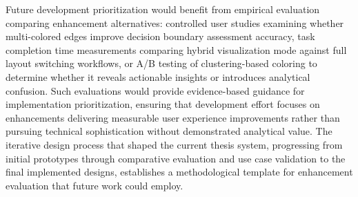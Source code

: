 Future development prioritization would benefit from empirical evaluation comparing enhancement alternatives: controlled user studies examining whether multi-colored edges improve decision boundary assessment accuracy, task completion time measurements comparing hybrid visualization mode against full layout switching workflows, or A/B testing of clustering-based coloring to determine whether it reveals actionable insights or introduces analytical confusion. Such evaluations would provide evidence-based guidance for implementation prioritization, ensuring that development effort focuses on enhancements delivering measurable user experience improvements rather than pursuing technical sophistication without demonstrated analytical value. The iterative design process that shaped the current thesis system, progressing from initial prototypes through comparative evaluation and use case validation to the final implemented designs, establishes a methodological template for enhancement evaluation that future work could employ.